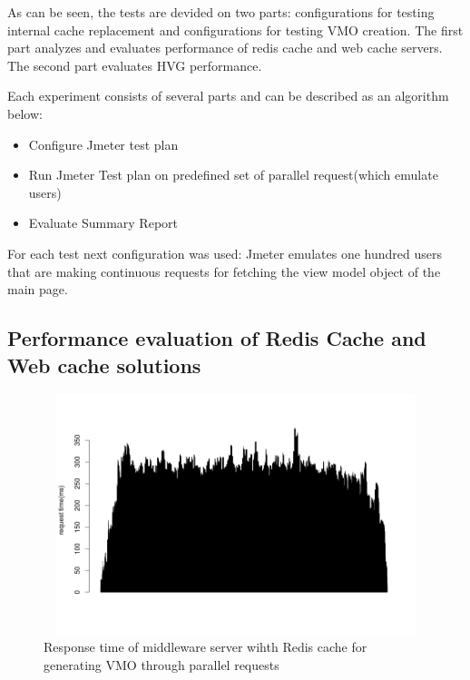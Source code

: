 As can be seen, the tests are devided on two parts: configurations for testing internal cache replacement and configurations for testing VMO creation. The first part analyzes and evaluates performance of redis cache and web cache servers. The second part  evaluates HVG performance.

Each experiment consists of several parts and can be described as an algorithm below: 

\begin{itemize}
  \item Configure Jmeter test plan
  \item Run Jmeter Test plan on predefined set of parallel request(which emulate users)
  \item Evaluate Summary Report
\end{itemize}

For each test next configuration was used: Jmeter emulates one hundred users that are making continuous requests for fetching the view model object of the main page.  


\subsection{Performance evaluation of Redis Cache and Web cache solutions}


\begin{figure}[h!]
    \centering
    \includegraphics[width=15cm,height=7cm,keepaspectratio]{images/vmo_redis_mult_par.png}
    \caption{Response time of middleware server wihth Redis cache for generating VMO through parallel requests}
    \label{fig:vmo_redis_mult_par}
\end{figure}


